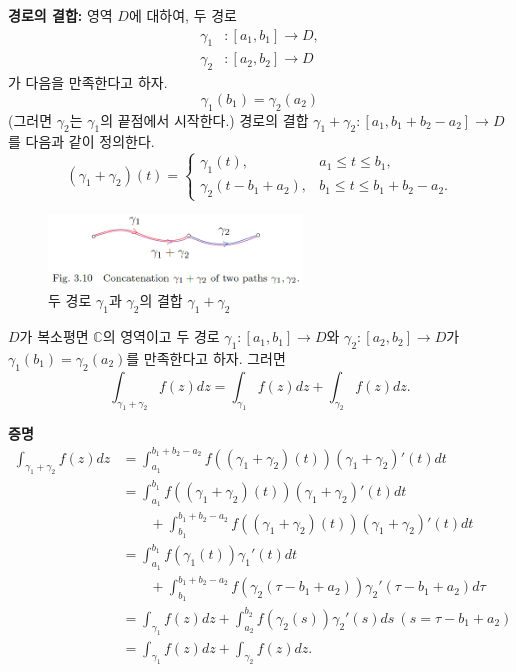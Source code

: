{\bf  경로의 결합:}
영역 $D$에 대하여, 두 경로
\begin{align*}
\gamma_1 &: [a_1, b_1] \to D, \\
\gamma_2 &: [a_2, b_2] \to D
\end{align*}
가 다음을 만족한다고 하자.
\[
\gamma_1(b_1) = \gamma_2(a_2)
\]
(그러면 $\gamma_2$는 $\gamma_1$의 끝점에서 시작한다.)
경로의 결합 $\gamma_1+\gamma_2: [a_1, b_1+b_2-a_2] \to D$를
다음과 같이 정의한다.
\[
(\gamma_1+\gamma_2)(t) = \begin{cases}
\gamma_1(t), & a_1\le t\le b_1, \\
\gamma_2(t-b_1+a_2), & b_1 \le t \le b_1+b_2-a_2.
\end{cases}
\]

\begin{figure}[!h]
\begin{center}
\includegraphics[width=0.6\textwidth]{./SaltChapter/fig-3-10}
\end{center}
\caption{두 경로 $\gamma_1$과  $\gamma_2$의 결합 $\gamma_1 + \gamma_2$}
\label{fig-3-10}
\end{figure}

\begin{salt_prop} \label{prop-3-3}
$D$가 복소평면 $\mathbb C$의 영역이고
두 경로 $\gamma_1: [a_1,b_1] \to D$와 $\gamma_2: [a_2,b_2] \to D$가 
$\gamma_1(b_1) = \gamma_2(a_2)$를 만족한다고 하자.
그러면
\[
\int_{\gamma_1+\gamma_2} f(z)dz 
=\int_{\gamma_1} f(z)dz + \int_{\gamma_2} f(z)dz.
\]
\end{salt_prop}

{\bf 증명}
\begin{align*}
\int_{\gamma_1+\gamma_2} f(z)dz 
&= \int_{a_1}^{b_1+b_2-a_2} f((\gamma_1+\gamma_2)(t)) (\gamma_1+\gamma_2)'(t)dt\\
&= \int_{a_1}^{b_1} f((\gamma_1+\gamma_2)(t)) (\gamma_1+\gamma_2)'(t)dt\\
& \quad\quad 
+\int_{b_1}^{b_1+b_2-a_2} f((\gamma_1+\gamma_2)(t)) (\gamma_1+\gamma_2)'(t)dt\\
&= \int_{a_1}^{b_1} f(\gamma_1(t))\gamma_1'(t)dt \\
&\quad\quad 
+ \int_{b_1}^{b_1+b_2-a_2} f(\gamma_2(\tau-b_1+a_2))\gamma_2'(\tau-b_1+a_2)d\tau\\
&= \int_{\gamma_1} f(z)dz + \int_{a_2}^{b_2} f(\gamma_2(s)) \gamma_2'(s)ds 
\ (s=\tau-b_1+a_2) \\
&= \int_{\gamma_1} f(z)dz + \int_{\gamma_2} f(z)dz.
\end{align*}


